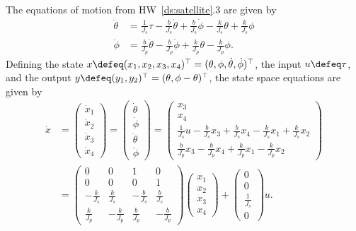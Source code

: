 
The equations of motion from HW~\ref{ds:satellite}.3 are given by
\begin{align*}
\ddot{\theta} &= \frac{1}{J_s}\tau - \frac{b}{J_s}\dot{\theta} + \frac{b}{J_s}\dot{\phi} - \frac{k}{J_s}\theta + \frac{k}{J_s}\phi \\
\ddot{\phi} &=  \frac{b}{J_p}\dot{\theta} - \frac{b}{J_p}\dot{\phi} + \frac{k}{J_p}\theta - \frac{k}{J_p}\phi.
\end{align*}
Defining the state $x\defeq (x_1, x_2, x_3, x_4)^{\top} = (\theta, \phi, \dot{\theta}, \dot{\phi})^{\top}$, the input $u\defeq\tau$, and the output $y\defeq(y_1, y_2)^{\top}=(\theta, \phi-\theta)^{\top}$, the state space equations are given by
\begin{align*}
\dot{x} &= \begin{pmatrix} \dot{x}_1 \\ \dot{x}_2 \\ \dot{x}_3 \\ \dot{x}_4 \end{pmatrix} = \begin{pmatrix} \dot{\theta} \\ \dot{\phi} \\ \ddot{\theta} \\ \ddot{\phi} \end{pmatrix} = \begin{pmatrix} x_3 \\ x_4 \\ \frac{1}{J_s}u - \frac{b}{J_s}x_3 + \frac{b}{J_s}x_4 - \frac{k}{J_s}x_1 + \frac{k}{J_s}x_2 \\
\frac{b}{J_p}x_3 - \frac{b}{J_p}x_4 + \frac{k}{J_p}x_1 - \frac{k}{J_p}x_2 \end{pmatrix} \\
&= \begin{pmatrix} 0 & 0 & 1 & 0 \\ 0 & 0 & 0 & 1 \\ -\frac{k}{J_s} & \frac{k}{J_s} & -\frac{b}{J_s} & \frac{b}{J_s} \\ \frac{k}{J_p} & -\frac{k}{J_p} & \frac{b}{J_p} & -\frac{b}{J_p} \end{pmatrix} \begin{pmatrix} x_1 \\ x_2 \\ x_3 \\ x_4 \end{pmatrix} + \begin{pmatrix} 0 \\ 0 \\ \frac{1}{J_s} \\ 0 \end{pmatrix} u.
\end{align*}
